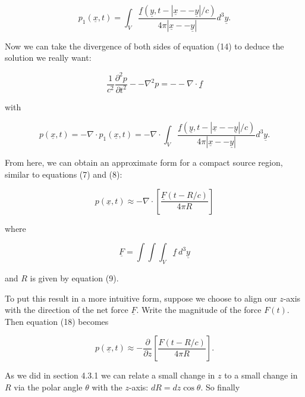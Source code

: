   
  \begin{equation*}p_1(\underline{x},t)=\int_V{\dfrac{\underline{f}(\underline{y},t-|\underline{x} 
  -- \underline{y}|/c)}{4 \pi |\underline{x} -- \underline{y}|} d^3 
  \underline{y}} . \tag{15}\end{equation*} 

  Now we can take the divergence of both sides of equation (14) to deduce the 
  solution we really want: 

  \begin{equation*}\dfrac{1}{c^2} \dfrac{\partial^2 p}{\partial t^2} -- 
  \nabla^2 p = -- \nabla \cdot \underline{f} \tag{16}\end{equation*} 

  \noindent{}with 

  \begin{equation*}p(\underline{x},t) = -\nabla \cdot p_1(\underline{x},t) = 
  -\nabla \cdot \int_V{\dfrac{\underline{f}(\underline{y},t-|\underline{x} -- 
  \underline{y}|/c)}{4 \pi |\underline{x} -- \underline{y}|} d^3 \underline{y}} 
  \tag{17} .\end{equation*} 

  From here, we can obtain an approximate form for a compact source region, 
  similar to equations (7) and (8): 

  \begin{equation*}p(\underline{x},t) \approx -\nabla \cdot \left[ 
  \dfrac{\underline{F}(t-R/c)}{4 \pi R} \right] \tag{18}\end{equation*} 

  \noindent{}where 

  \begin{equation*}\underline{F} = \int \int \int_V{\underline{f} \mathrm{~} 
  d^3 \underline{y}} \tag{19}\end{equation*} 

  \noindent{}and $R$ is given by equation (9). 

  To put this result in a more intuitive form, suppose we choose to align our 
  $z$-axis with the direction of the net force $\underline{F}$. Write the 
  magnitude of the force $F(t)$. Then equation (18) becomes 

  \begin{equation*}p(\underline{x},t) \approx -\dfrac{\partial}{\partial z} 
  \left[ \dfrac{F(t-R/c)}{4 \pi R} \right] . \tag{20}\end{equation*} 

  As we did in section 4.3.1 we can relate a small change in $z$ to a small 
  change in $R$ via the polar angle $\theta$ with the $z$-axis: $dR=dz \cos 
  \theta$. So finally 

